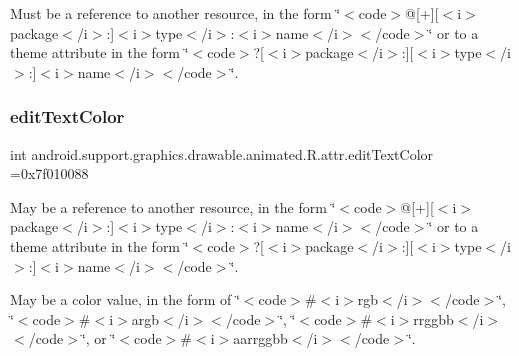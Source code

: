 Must be a reference to another resource, in the form \char`\"{}$<$code$>$@\mbox{[}+\mbox{]}\mbox{[}$<$i$>$package$<$/i$>$\+:\mbox{]}$<$i$>$type$<$/i$>$\+:$<$i$>$name$<$/i$>$$<$/code$>$\char`\"{} or to a theme attribute in the form \char`\"{}$<$code$>$?\mbox{[}$<$i$>$package$<$/i$>$\+:\mbox{]}\mbox{[}$<$i$>$type$<$/i$>$\+:\mbox{]}$<$i$>$name$<$/i$>$$<$/code$>$\char`\"{}. \mbox{\label{classandroid_1_1support_1_1graphics_1_1drawable_1_1animated_1_1R_1_1attr_ab015c1b2beb497310275e75a01d4f093}} 
\subsubsection{\texorpdfstring{edit\+Text\+Color}{editTextColor}}
{\footnotesize\ttfamily int android.\+support.\+graphics.\+drawable.\+animated.\+R.\+attr.\+edit\+Text\+Color =0x7f010088\hspace{0.3cm}{\ttfamily [static]}}

May be a reference to another resource, in the form \char`\"{}$<$code$>$@\mbox{[}+\mbox{]}\mbox{[}$<$i$>$package$<$/i$>$\+:\mbox{]}$<$i$>$type$<$/i$>$\+:$<$i$>$name$<$/i$>$$<$/code$>$\char`\"{} or to a theme attribute in the form \char`\"{}$<$code$>$?\mbox{[}$<$i$>$package$<$/i$>$\+:\mbox{]}\mbox{[}$<$i$>$type$<$/i$>$\+:\mbox{]}$<$i$>$name$<$/i$>$$<$/code$>$\char`\"{}. 

May be a color value, in the form of \char`\"{}$<$code$>$\#$<$i$>$rgb$<$/i$>$$<$/code$>$\char`\"{}, \char`\"{}$<$code$>$\#$<$i$>$argb$<$/i$>$$<$/code$>$\char`\"{}, \char`\"{}$<$code$>$\#$<$i$>$rrggbb$<$/i$>$$<$/code$>$\char`\"{}, or \char`\"{}$<$code$>$\#$<$i$>$aarrggbb$<$/i$>$$<$/code$>$\char`\"{}. \mbox{\label{classandroid_1_1support_1_1graphics_1_1drawable_1_1animated_1_1R_1_1attr_aa8f0337dfcf892276a0587aa6d0b191d}} 
